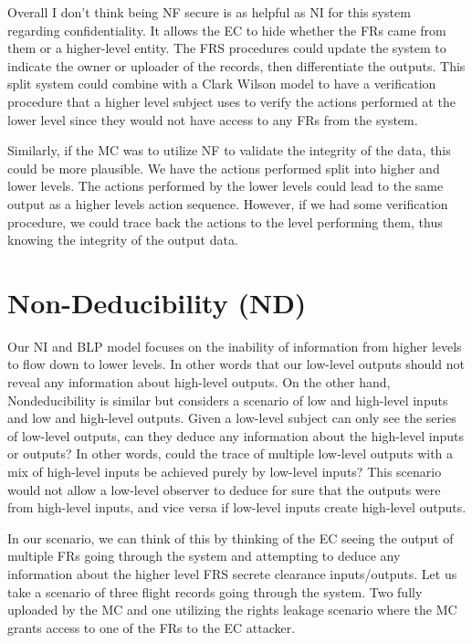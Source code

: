 \documentclass[10pt,journal,compsoc]{IEEEtran}
\begin{document}
Overall I don't think being NF secure is as helpful as NI for this system regarding confidentiality. It allows the EC to hide whether the FRs came from them or a higher-level entity. The FRS procedures could update the system to indicate the owner or uploader of the records, then differentiate the outputs. This split system could combine with a Clark Wilson model to have a verification procedure that a higher level subject uses to verify the actions performed at the lower level since they would not have access to any FRs from the system. 

Similarly, if the MC was to utilize NF to validate the integrity of the data, this could be more plausible. We have the actions performed split into higher and lower levels. The actions performed by the lower levels could lead to the same output as a higher levels action sequence. However, if we had some verification procedure, we could trace back the actions to the level performing them, thus knowing the integrity of the output data. 

\section{Non-Deducibility (ND)}

Our NI and BLP model focuses on the inability of information from higher levels to flow down to lower levels. In other words that our low-level outputs should not reveal any information about high-level outputs. On the other hand, Nondeducibility is similar but considers a scenario of low and high-level inputs and low and high-level outputs. Given a low-level subject can only see the series of low-level outputs, can they deduce any information about the high-level inputs or outputs? In other words, could the trace of multiple low-level outputs with a mix of high-level inputs be achieved purely by low-level inputs? This scenario would not allow a low-level observer to deduce for sure that the outputs were from high-level inputs, and vice versa if low-level inputs create high-level outputs.

In our scenario, we can think of this by thinking of the EC seeing the output of multiple FRs going through the system and attempting to deduce any information about the higher level FRS secrete clearance inputs/outputs. Let us take a scenario of three flight records going through the system. Two fully uploaded by the MC and one utilizing the rights leakage scenario where the MC grants access to one of the FRs to the EC attacker. 
\end{document}
